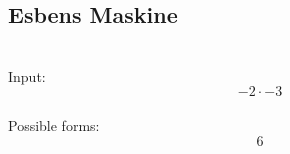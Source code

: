 \documentclass{article}
\begin{document}
\subsection{Esbens Maskine}
\\Input:
\[-2\cdot -3\]
\\Possible forms:
\[6\]
\end{document}
